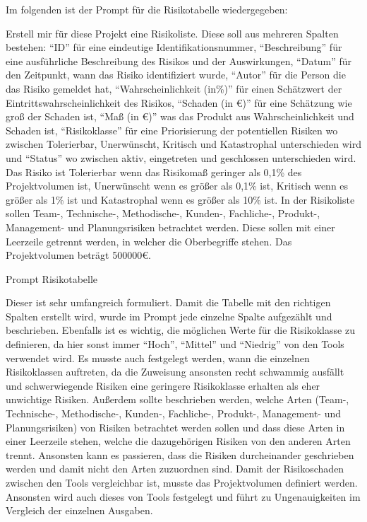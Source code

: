 Im folgenden ist der Prompt für die Risikotabelle wiedergegeben:

\begin{prompt}[H]
    \begin{tcolorbox}[colback=gray!20, colframe=gray!20, boxrule=0pt, sharp corners] 
        Erstell mir für diese Projekt eine Risikoliste. Diese soll aus mehreren Spalten bestehen: ``ID'' für eine 
        eindeutige Identifikationsnummer, ``Beschreibung'' für eine ausführliche Beschreibung des Risikos und der 
        Auswirkungen, ``Datum'' für den Zeitpunkt, wann das Risiko identifiziert wurde, ``Autor'' für die Person die 
        das Risiko gemeldet hat, ``Wahrscheinlichkeit (in\%)'' für einen Schätzwert der Eintrittswahrscheinlichkeit 
        des Risikos, ``Schaden (in €)'' für eine Schätzung wie groß der Schaden ist, ``Maß (in €)'' was das Produkt aus 
        Wahrscheinlichkeit und Schaden ist, ``Risikoklasse'' für eine Priorisierung der potentiellen Risiken wo 
        zwischen Tolerierbar, Unerwünscht, Kritisch und Katastrophal unterschieden wird und ``Status'' wo zwischen 
        aktiv, eingetreten und geschlossen unterschieden wird. Das Risiko ist Tolerierbar wenn das Risikomaß geringer 
        als 0,1\% des Projektvolumen ist, Unerwünscht wenn es größer als 0,1\% ist, Kritisch wenn es größer als 1\% 
        ist und Katastrophal wenn es größer als 10\% ist. In der Risikoliste sollen Team-, Technische-, Methodische-, 
        Kunden-, Fachliche-, Produkt-, Management- und Planungsrisiken betrachtet werden. Diese sollen mit einer 
        Leerzeile getrennt werden, in welcher die Oberbegriffe stehen. Das Projektvolumen beträgt 500000€.
        \vfill
    \end{tcolorbox}
    \caption{Prompt Risikotabelle}
    \label{Prompt Risikotabelle}
\end{prompt}

Dieser ist sehr umfangreich formuliert. Damit die Tabelle mit den richtigen Spalten erstellt wird, wurde im Prompt jede
einzelne Spalte aufgezählt und beschrieben. Ebenfalls ist es wichtig, die möglichen Werte für die Risikoklasse zu 
definieren, da hier sonst immer ``Hoch'', ``Mittel'' und ``Niedrig'' von den Tools verwendet wird. Es musste auch 
festgelegt werden, wann die einzelnen Risikoklassen auftreten, da die Zuweisung ansonsten recht schwammig ausfällt und
schwerwiegende Risiken eine geringere Risikoklasse erhalten als eher unwichtige Risiken. Außerdem sollte beschrieben 
werden, welche Arten (Team-, Technische-, Methodische-, Kunden-, Fachliche-, Produkt-, Management- und Planungsrisiken) 
von Risiken betrachtet werden sollen und dass diese Arten in einer Leerzeile stehen, welche die dazugehörigen Risiken von 
den anderen Arten trennt. Ansonsten kann es passieren, dass die Risiken durcheinander geschrieben werden und damit nicht 
den Arten zuzuordnen sind. Damit der Risikoschaden zwischen den Tools vergleichbar ist, musste das Projektvolumen definiert 
werden. Ansonsten wird auch dieses von Tools festgelegt und führt zu Ungenauigkeiten im Vergleich der einzelnen Ausgaben.

